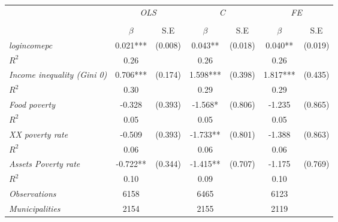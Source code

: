 


\begin{tabular}{lcccccc}


\hline
\hline

\multicolumn{1}{l}{} & \multicolumn{2}{c}{\textit{OLS}} & \multicolumn{2}{c}{\textit{C}} & \multicolumn{2}{c}{\textit{FE}}   \\ 
\cmidrule(l{1mm}r{1mm}){2-3} \cmidrule(l{1mm}r{1mm}){4-5} \cmidrule(l{1mm}r{1mm}){6-7}   \\
& $\beta$ & S.E & $\beta$ & S.E & $\beta$ & S.E \\
\hline


\textit{logincomepc}    &  0.021***    & (0.008)      &   0.043**        &  (0.018)      &     0.040**  &    (0.019)   \\
$R^{2}$			         &  0.26   & 	   &     0.26   	&		 &     0.26   &  \\
					
\textit{Income inequality (Gini 0\-1)}    &  0.706***    & (0.174)      &   1.598***        &  (0.398)      &     1.817***  &    (0.435)  \\
$R^{2}$			         &  0.30   & 	   &     0.29   	&		 &     0.29   &  \\
					
\textit{Food poverty}    &  -0.328    & (0.393)      &   -1.568*        &  (0.806)      &     -1.235  &    (0.865)  \\
$R^{2}$			         &  0.05   & 	   &     0.05   	&		 &     0.05   &   \\
					
\textit{XX poverty rate}    &  -0.509    & (0.393)      &   -1.733**        &  (0.801)      &     -1.388  &    (0.863)  \\
$R^{2}$			         &  0.06   & 	   &     0.06   	&		 &     0.06   &  \\
					
\textit{Assets Poverty rate}    &  -0.722**    & (0.344)      &   -1.415**        &  (0.707)      &     -1.175  &    (0.769)  \\
$R^{2}$			         &  0.10   & 	   &     0.09   	&		 &     0.10   &   \\


\hline		

\textit{Observations}              &   6158    &  & 6465    &  &  6123   &  		\\
\textit{Municipalities}               &   2154   &  & 2155   &  &  2119  &  		\\


\end{tabular}%

